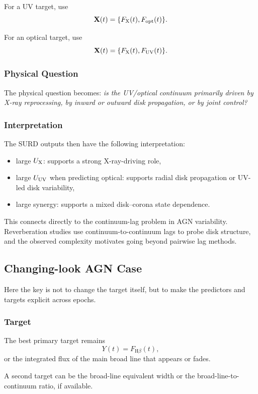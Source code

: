 \documentclass{article}
\begin{document}
For a UV target, use
\[
\mathbf{X}(t)=\{F_{\rm X}(t),F_{\rm opt}(t)\}.
\]

For an optical target, use
\[
\mathbf{X}(t)=\{F_{\rm X}(t),F_{\rm UV}(t)\}.
\]

\subsubsection{Physical Question}

The physical question becomes: \emph{is the UV/optical continuum primarily driven by X-ray reprocessing, by inward or outward disk propagation, or by joint control?}

\subsubsection{Interpretation}

The SURD outputs then have the following interpretation:
\begin{itemize}
    \item large \(U_{\rm X}\): supports a strong X-ray-driving role,
    \item large \(U_{\rm UV}\) when predicting optical: supports radial disk propagation or UV-led disk variability,
    \item large synergy: supports a mixed disk--corona state dependence.
\end{itemize}

This connects directly to the continuum-lag problem in AGN variability. Reverberation studies use continuum-to-continuum lags to probe disk structure, and the observed complexity motivates going beyond pairwise lag methods.

\subsection{Changing-look AGN Case}

Here the key is not to change the target itself, but to make the predictors and targets explicit across epochs.

\subsubsection{Target}

The best primary target remains
\[
Y(t)=F_{\mathrm{H}\beta}(t),
\]
or the integrated flux of the main broad line that appears or fades.

A second target can be the broad-line equivalent width or the broad-line-to-continuum ratio, if available.
\end{document}
